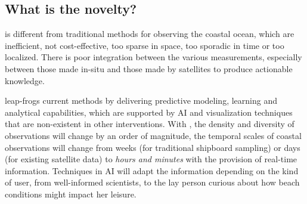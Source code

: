 \documentclass[12pt]{article}
\begin{document}




\vspace*{0.1cm}
\subsection{What is the novelty?}

\pro is different from traditional methods for observing the coastal
ocean, which are inefficient, not cost-effective, too sparse in space,
too sporadic in time or too localized. There is poor integration
between the various measurements, especially between those made
in-situ and those made by satellites to produce actionable knowledge.

\pro leap-frogs current methods by delivering predictive modeling,
learning and analytical capabilities, which are supported by AI and
visualization techniques that are non-existent in other interventions.
With \pro, the density and diversity of observations will change by an
order of magnitude, the temporal scales of coastal observations will
change from weeks (for traditional shipboard sampling) or days (for
existing satellite data) to \emph{hours and minutes} with the
provision of real-time information. Techniques in AI will adapt the
information depending on the kind of user, from well-informed
scientists, to the lay person curious about how beach conditions might
impact her leisure. 
\end{document}
